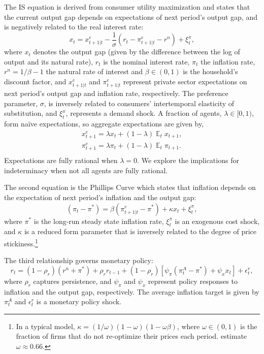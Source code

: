 \documentclass[english,authoryear,12pt]{elsarticle}
\DeclareMathOperator{\E}{\mathbb{E}}
\begin{document}
The IS equation is derived from consumer utility maximization and states that the current output gap depends on expectations of next period's output gap, and is negatively related to the real interest rate:
\begin{equation}\label{eq:ISe}
	x_t = x_{t+1|t}^e - \frac{1}{\sigma} \left( r_t - \pi_{t+1|t}^e  - r^n  \right) + \xi_t^{x},
\end{equation}
where $x_t$ denotes the output gap (given by the difference between the log of output and its natural rate), $r_t$ is the nominal interest rate, $\pi_t$ the inflation rate, $r^n = 1/\beta - 1$ the natural rate of interest and $\beta \in (0,1)$ is the household's discount factor, and $x_{t+1|t}^e$ and $\pi_{t+1|t}^e$ represent private sector expectations on next period's output gap and inflation rate, respectively. The preference parameter, $\sigma$, is inversely related to consumers' intertemporal elasticity of substitution, and $\xi_t^x$, represents a demand shock. A fraction of agents, $\lambda\in[0,1)$, form na\"ive expectations, so aggregate expectations are given by,
\begin{equation}
	\begin{array}{c}
		x_{t+1}^e = \lambda x_t + (1-\lambda) \E_t x_{t+1}, \\ [1.5pc]
		\pi_{t+1}^e = \lambda \pi_t + (1-\lambda) \E_t \pi_{t+1}. \\
	\end{array}
\end{equation}
Expectations are fully rational when $\lambda=0$. We explore the implications for indeterminacy when not all agents are fully rational.

The second equation is the Phillips Curve which states that inflation depends on the expectation of next period's inflation and the output gap:
\begin{equation}\label{eq:PhillipsCurvee}
	(\pi_t - \pi^*) = \beta (\pi_{t+1|t}^e - \pi^*) + \kappa x_t + \xi_t^{\pi},
\end{equation}
where $\pi^*$ is the long-run steady state inflation rate, $\xi_t^\pi$ is an exogenous cost shock, and $\kappa$ is a reduced form parameter that is inversely related to the degree of price stickiness.\footnote{In a typical model, $\kappa=(1/\omega)(1-\omega)(1-\omega\beta)$, where $\omega \in (0,1)$ is the fraction of firms that do not re-optimize their prices each period. \citet{smetswouters2007} estimate $\omega \approx 0.66$.}

The third relationship governs monetary policy:
\begin{equation}\label{eq:TaylorRule}
	r_t = (1-\rho_r)(r^n + \pi^*) + \rho_r r_{t-1} + (1-\rho_r) \left[ \psi_\pi (\pi_t^A - \pi^*) + \psi_x x_t \right] + \epsilon_t^{r},
\end{equation}
where $\rho_r$ captures persistence, and $\psi_\pi$ and $\psi_x$ represent policy responses to inflation and the output gap, respectively. The average inflation target is given by $\pi_t^A$ and $\epsilon_t^r$ is a monetary policy shock.
\end{document}
